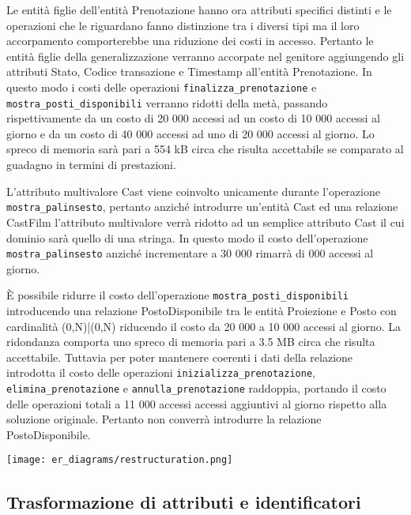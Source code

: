 Le entità figlie dell'entità Prenotazione hanno ora attributi specifici
distinti e le operazioni che le riguardano fanno distinzione tra i diversi
tipi ma il loro accorpamento comporterebbe una riduzione dei costi in accesso.
Pertanto le entità figlie della generalizzazione verranno accorpate nel
genitore aggiungendo gli attributi Stato, Codice transazione e Timestamp
all'entità Prenotazione.
In questo modo i costi delle operazioni \verb|finalizza_prenotazione|
e \verb|mostra_posti_disponibili| verranno ridotti della metà, passando
rispettivamente da un costo di 20 000 accessi ad un costo di 10 000 accessi
al giorno e da un costo di 40 000 accessi ad uno di 20 000 accessi al giorno.
Lo spreco di memoria sarà pari a
554 kB circa che risulta accettabile se comparato al guadagno in termini di
prestazioni.

L'attributo multivalore Cast viene coinvolto unicamente durante l'operazione
\verb|mostra_palinsesto|,
pertanto anziché introdurre un'entità Cast ed una relazione CastFilm
l'attributo multivalore verrà ridotto ad un semplice attributo Cast il cui
dominio sarà quello di una stringa.
In questo modo il costo dell'operazione \verb|mostra_palinsesto| anziché
incrementare a 30 000 rimarrà di  000 accessi al giorno.

\pagebreak
È possibile ridurre il costo dell'operazione \verb|mostra_posti_disponibili|
introducendo una relazione PostoDisponibile tra le entità Proiezione e Posto con
cardinalità (0,N)|(0,N) riducendo il costo da 20 000 a 10 000 accessi al giorno.
La ridondanza comporta uno spreco di memoria pari a
3.5 MB circa che risulta accettabile.
Tuttavia per poter mantenere coerenti i dati della relazione introdotta il costo
delle operazioni \verb|inizializza_prenotazione|,
\verb|elimina_prenotazione| e \verb|annulla_prenotazione|
raddoppia, portando il costo delle operazioni totali a
11 000 accessi accessi aggiuntivi al giorno rispetto alla soluzione originale.
Pertanto non converrà introdurre la relazione PostoDisponibile.

\texttt{[image: er\_diagrams/restructuration.png]}

\subsection*{Trasformazione di attributi e identificatori}
%
%


